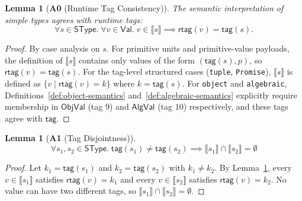 \documentclass[11pt]{article}
\newtheorem{lemma}[theorem]{Lemma}
\newcommand{\sem}[1]{\llbracket #1 \rrbracket}
\newcommand{\ObjVal}{\mathsf{ObjVal}}
\newcommand{\AlgVal}{\mathsf{AlgVal}}
\newcommand{\SType}{\mathsf{SType}}
\newcommand{\tagfn}{\mathsf{tag}}
\newcommand{\rtag}{\mathsf{rtag}}
\newcommand{\Val}{\mathsf{Val}}
\begin{document}
\begin{lemma}[\textbf{A0} (Runtime Tag Consistency)]
\label{ax:A0}
The semantic interpretation of simple types agrees with runtime tags:
\[
\forall s \in \SType.\; \forall v \in \Val.\; v \in \sem{s} \implies \rtag(v) = \tagfn(s).
\]
\end{lemma}

\begin{proof}
By case analysis on $s$.
For primitive units and primitive-value payloads, the definition of $\sem{s}$ contains only values of the form $(\tagfn(s),p)$, so $\rtag(v)=\tagfn(s)$.
For the tag-level structured cases (\texttt{tuple}, \texttt{Promise}), $\sem{s}$ is defined as $\{v \mid \rtag(v)=k\}$ where $k=\tagfn(s)$.
For \texttt{object} and \texttt{algebraic}, Definitions~\ref{def:object-semantics} and~\ref{def:algebraic-semantics} explicitly require membership in $\ObjVal$ (tag $9$) and $\AlgVal$ (tag $10$) respectively, and these tags agree with $\tagfn$.
\end{proof}

\begin{lemma}[\textbf{A1} (Tag Disjointness)]
\label{ax:A1}
\[
\forall s_1, s_2 \in \SType.\; \tagfn(s_1) \neq \tagfn(s_2) \implies \sem{s_1} \cap \sem{s_2} = \emptyset
\]
\end{lemma}

\begin{proof}
Let $k_1=\tagfn(s_1)$ and $k_2=\tagfn(s_2)$ with $k_1\neq k_2$.
By Lemma~\ref{ax:A0}, every $v \in \sem{s_1}$ satisfies $\rtag(v)=k_1$ and every $v \in \sem{s_2}$ satisfies $\rtag(v)=k_2$.
No value can have two different tags, so $\sem{s_1}\cap \sem{s_2}=\emptyset$.
\end{proof}
\end{document}
